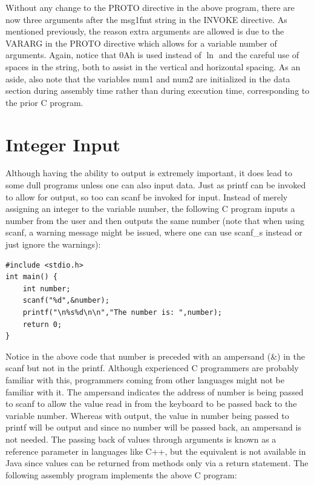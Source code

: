 \documentclass[10pt]{book}
\begin{document}
Without any change to the PROTO directive in the above program, there are now three arguments after the msg1fmt string in the INVOKE directive. As mentioned previously, the reason extra arguments are allowed is due to the VARARG in the PROTO directive which allows for a variable number of arguments. Again, notice that 0Ah is used instead of $\ln$ and the careful use of spaces in the string, both to assist in the vertical and horizontal spacing. As an aside, also note that the variables num1 and num2 are initialized in the data section during assembly time rather than during execution time, corresponding to the prior C program.

\section{Integer Input}
Although having the ability to output is extremely important, it does lead to some dull programs unless one can also input data. Just as printf can be invoked to allow for output, so too can scanf be invoked for input. Instead of merely assigning an integer to the variable number, the following C program inputs a\\
number from the user and then outputs the same number (note that when using scanf, a warning message might be issued, where one can use scanf\_s instead or just ignore the warnings):


\begin{verbatim}
#include <stdio.h>
int main() {
    int number;
    scanf("%d",&number);
    printf("\n%s%d\n\n","The number is: ",number);
    return 0;
}
\end{verbatim}

Notice in the above code that number is preceded with an ampersand (\&) in the scanf but not in the printf. Although experienced C programmers are probably familiar with this, programmers coming from other languages might not be familiar with it. The ampersand indicates the address of number is being passed to scanf to allow the value read in from the keyboard to be passed back to the variable number. Whereas with output, the value in number being passed to printf will be output and since no number will be passed back, an ampersand is not needed. The passing back of values through arguments is known as a reference parameter in languages like C++, but the equivalent is not available in Java since values can be returned from methods only via a return statement. The following assembly program implements the above C program:
\end{document}
